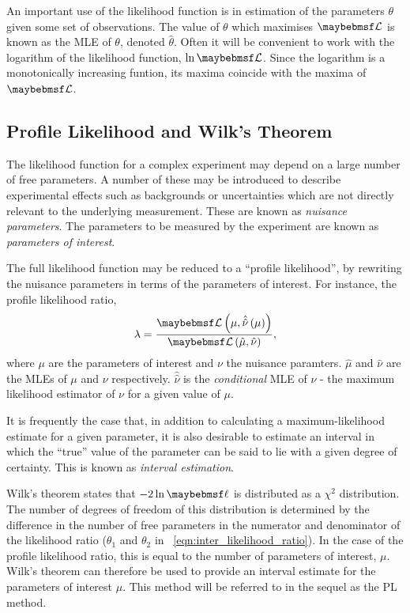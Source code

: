An important use of the likelihood function is in estimation of the parameters
$\theta$ given some set of observations. The value of $\theta$ which maximises
$\likelihood$ is known as the \acl{MLE} of $\theta$, denoted
$\hat{\theta}$. Often it will be convenient to work with the logarithm of the
likelihood function, $\ln\likelihood$. Since the logarithm is a monotonically
increasing funtion, its maxima coincide with the maxima of $\likelihood$.


\subsection{Profile Likelihood and Wilk's Theorem}
\label{sec:inter_profile_likelihood}
The likelihood function for a complex experiment may depend on a large number of
free parameters. A number of these may be introduced to describe experimental
effects such as backgrounds or uncertainties which are not directly relevant to
the underlying measurement. These are known as \emph{nuisance parameters}. The
parameters to be measured by the experiment are known as \emph{parameters of
  interest}.

The full likelihood function may be reduced to a ``profile likelihood'', by
rewriting the nuisance parameters in terms of the parameters of interest. For
instance, the profile likelihood ratio,
\begin{equation*}
  \lambda = \frac{\likelihood\left(\mu, \hat{\hat{\nu}}\left(\mu\right)\right)}{\likelihood\left(\hat{\mu}, \hat{\nu}\right)},
\end{equation*}
where $\mu$ are the parameters of interest and $\nu$ the nuisance
paramters. $\hat{\mu}$ and $\hat{\nu}$ are the \acp{MLE} of $\mu$ and $\nu$
respectively. $\hat{\hat{\nu}}$ is the \emph{conditional} \ac{MLE} of $\nu$ -
the maximum likelihood estimator of $\nu$ for a given value of $\mu$.

It is frequently the case that, in addition to calculating a maximum-likelihood
estimate for a given parameter, it is also desirable to estimate an interval in
which the ``true'' value of the parameter can be said to lie with a given degree
of certainty. This is known as \emph{interval estimation}.

Wilk's theorem states that $-2\ln\likelihoodratio$ is distributed as a $\chi^2$
distribution. The number of degrees of freedom of this distribution is
determined by the difference in the number of free parameters in the numerator
and denominator of the likelihood ratio ($\theta_1$ and $\theta_2$ in
\eqn~\ref{eqn:inter_likelihood_ratio}). In the case of the profile likelihood
ratio, this is equal to the number of parameters of interest, $\mu$. Wilk's
theorem can therefore be used to provide an interval estimate for the parameters
of interest $\mu$. This method will be referred to in the sequel as the \ac{PL}
method.

